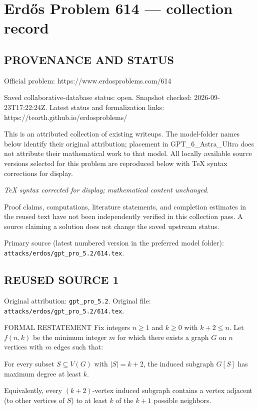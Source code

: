 \section*{Erd\H{o}s Problem 614 --- collection record}

\subsection*{PROVENANCE AND STATUS}
Official problem: https://www.erdosproblems.com/614

Saved collaborative-database status: open.
Snapshot checked: 2026-09-23T17:22:24Z.
Latest status and formalization links: https://teorth.github.io/erdosproblems/

This is an attributed collection of existing writeups. The model-folder names below identify their original attribution; placement in GPT\_6\_Astra\_Ultra does not attribute their mathematical work to that model. All locally available source versions selected for this problem are reproduced below with TeX syntax corrections for display.

\emph{TeX syntax corrected for display; mathematical content unchanged.}

Proof claims, computations, literature statements, and completion estimates in the reused text have not been independently verified in this collection pass. A source claiming a solution does not change the saved upstream status.

Primary source (latest numbered version in the preferred model folder): \texttt{attacks/erdos/gpt\_pro\_5.2/614.tex}.

\subsection*{REUSED SOURCE 1}
Original attribution: \texttt{gpt\_pro\_5.2}.
Original file: \texttt{attacks/erdos/gpt\_pro\_5.2/614.tex}.


FORMAL RESTATEMENT
Fix integers $n\ge 1$ and $k\ge 0$ with $k+2\le n$.
Let $f(n,k)$ be the minimum integer $m$ for which there exists a graph $G$ on $n$
vertices with $m$ edges such that:

\medskip
\noindent For every subset $S\subseteq V(G)$ with $|S|=k+2$, the induced subgraph
$G[S]$ has maximum degree at least $k$.

Equivalently, every $(k+2)$-vertex induced subgraph contains a vertex adjacent
(to other vertices of $S$) to at least $k$ of the $k+1$ possible neighbors.

